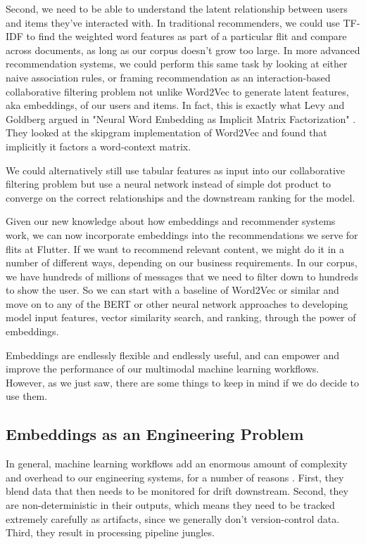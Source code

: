 \documentclass[11pt, table]{diazessay} %
\begin{document}
\begin{sloppypar}
Second, we need to be able to understand the latent relationship between users and items they've interacted with. In traditional recommenders, we could use TF-IDF to find the weighted word features as part of a particular flit and compare across documents, as long as our corpus doesn't grow too large. In more advanced recommendation systems, we could perform this same task by looking at either naive association rules, or framing recommendation as an interaction-based collaborative filtering problem not unlike Word2Vec to generate latent features, aka embeddings, of our users and items. In fact, this is exactly what Levy and Goldberg argued in "Neural Word Embedding as Implicit Matrix Factorization"  \citep{levy2014neural}. They looked at the skipgram implementation of Word2Vec and found that implicitly it factors a word-context matrix.

We could alternatively still use tabular features as input into our collaborative filtering problem but use a neural network \citep{he2017neural} instead of simple dot product to converge on the correct relationships and the downstream ranking for the model.

Given our new knowledge about how embeddings and recommender systems work, we can now incorporate embeddings into the recommendations we serve for flits at Flutter.  If we want to recommend relevant content, we might do it in a number of different ways, depending on our business requirements.  In our corpus, we have hundreds of millions of messages that we need to filter down to hundreds to show the user. So we can start with a baseline of Word2Vec or similar and move on to any of the BERT or other neural network approaches to developing model input features, vector similarity search, and ranking, through the power of embeddings.

Embeddings are endlessly flexible and endlessly useful, and can empower and improve the performance of our multimodal machine learning workflows. However, as we just saw, there are some things to keep in mind if we do decide to use them.

\subsection{Embeddings as an Engineering Problem}

In general, machine learning workflows add an enormous amount of complexity and overhead to our engineering systems, for a number of reasons \citep{sculley2014machine}. First, they blend data that then needs to be monitored for drift downstream. Second, they are non-deterministic in their outputs, which means they need to be tracked extremely carefully as artifacts, since we generally don't version-control data. Third, they result in processing pipeline jungles.



\end{sloppypar}
\end{document}
